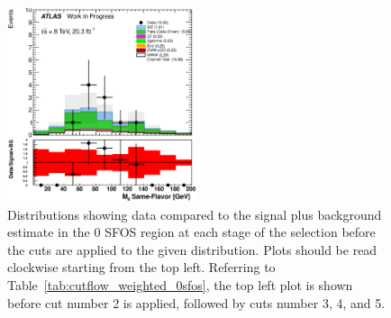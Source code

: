 \begin{figure}[ht!]
\includegraphics[width=0.495\textwidth]{figures/appendix_signal_selection/Nov24Update_FakeSys_KFacSys_LinearY_Rebin/output/jobs/MxM/DataFull_Rates_May13_FakeRatesExactly2Loose_MuonMxMBJetGt0_ElBJetGt0SubtractPC_MxM/PreselectionNov23_15_0SFOS_ChargeAbs1_BVeto85_physics/weight_all/eps/InvariantMassSF_histratio.eps}

\caption{Distributions showing data compared to the signal plus background estimate in the 0 SFOS region at each stage 
of the selection before the cuts are applied to the given distribution. 
Plots should be read clockwise starting from the top left.
Referring to Table~\ref{tab:cutflow_weighted_0sfos}, the top left
plot is shown before cut number 2 is applied, followed by cuts
number 3, 4, and 5.
}
\label{fig:0sfos_1}
\end{figure}

